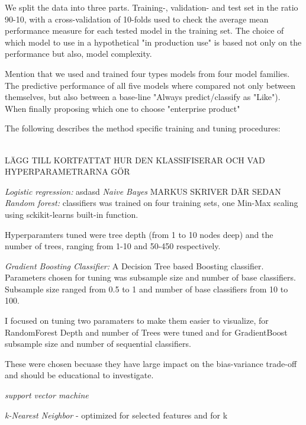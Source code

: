 \documentclass{article}
\begin{document}
    
    
    
    
    
    
    
    We split the data into three parts. Training-, validation- and test set in the ratio 90-10, with a cross-validation of 10-folds used to check the average mean performance measure for each tested model in the training set. The choice of which model to use in a hypothetical "in production use" is based not only on the performance but also, model complexity.
    

    Mention that we used and trained four types models from four model families. The predictive performance of all five models where compared not only between themselves, but also between a base-line "Always predict/classify as "Like"). When finally proposing which one to choose "enterprise product" 



    The following describes the method specific training and tuning procedures: 
    
    
    \\
    LÄGG TILL KORTFATTAT HUR DEN KLASSIFISERAR OCH VAD HYPERPARAMETRARNA GÖR
    
    \textit{Logistic regression:} asdasd
    \textit{Naive Bayes} MARKUS SKRIVER DÄR SEDAN
    \textit{Random forest:} classifiers was trained on four training sets, one Min-Max scaling using sckikit-learns built-in function.
    
    Hyperparamters tuned were tree depth (from 1 to 10 nodes deep) and the number of trees, ranging from 1-10 and 50-450 respectively.
    
    \textit{Gradient Boosting Classifier:}
    A Decision Tree based Boosting classifier. Parameters chosen for tuning was subsample size and number of base classifiers. Subsample size ranged from 0.5 to 1 and number of base classifiers from 10 to 100.
    
     I focused on tuning two paramaters to make them easier to visualize, for RandomForest Depth and number of Trees were tuned and for GradientBoost subsample size and number of sequential classifiers.
    
    These were chosen becuase they have large impact on the bias-variance trade-off and should be educational to investigate.

    
    \textit{support vector machine} 
    
    \textit{k-Nearest Neighbor}
    - optimized for selected features and for k
    
\end{document}
